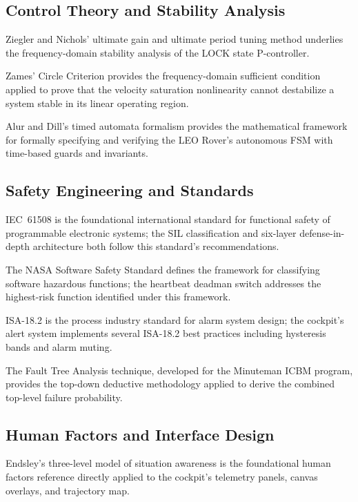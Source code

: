 \subsection{Control Theory and Stability Analysis}

\textbf{\cite{ziegler1942optimum}} Ziegler and Nichols' ultimate gain and ultimate period tuning method underlies the frequency-domain stability analysis of the LOCK state P-controller.

\textbf{\cite{zames1966inputoutput}} Zames' Circle Criterion provides the frequency-domain sufficient condition applied to prove that the velocity saturation nonlinearity cannot destabilize a system stable in its linear operating region.

\textbf{\cite{alur1994theory}} Alur and Dill's timed automata formalism provides the mathematical framework for formally specifying and verifying the LEO Rover's autonomous FSM with time-based guards and invariants.

\subsection{Safety Engineering and Standards}

\textbf{\cite{iec61508}} IEC~61508 is the foundational international standard for functional safety of programmable electronic systems; the SIL classification and six-layer defense-in-depth architecture both follow this standard's recommendations.

\textbf{\cite{nasa8719}} The NASA Software Safety Standard defines the framework for classifying software hazardous functions; the heartbeat deadman switch addresses the highest-risk function identified under this framework.

\textbf{\cite{isa182}} ISA-18.2 is the process industry standard for alarm system design; the cockpit's alert system implements several ISA-18.2 best practices including hysteresis bands and alarm muting.

\textbf{\cite{sobczak1962fault}} The Fault Tree Analysis technique, developed for the Minuteman ICBM program, provides the top-down deductive methodology applied to derive the combined top-level failure probability.

\subsection{Human Factors and Interface Design}

\textbf{\cite{endsley1988design}} Endsley's three-level model of situation awareness is the foundational human factors reference directly applied to the cockpit's telemetry panels, canvas overlays, and trajectory map.

